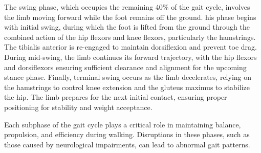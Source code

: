 The swing phase, which occupies the remaining 40\% of the gait cycle, involves the limb moving forward while the foot remains off the ground. his phase begins with initial swing, during which the foot is lifted from the ground through the combined action of the hip flexors and knee flexors, particularly the hamstrings. The tibialis anterior is re-engaged to maintain dorsiflexion and prevent toe drag. During mid-swing, the limb continues its forward trajectory, with the hip flexors and dorsiflexors ensuring sufficient clearance and alignment for the upcoming stance phase. Finally, terminal swing occurs as the limb decelerates, relying on the hamstrings to control knee extension and the gluteus maximus to stabilize the hip. The limb prepares for the next initial contact, ensuring proper positioning for stability and weight acceptance.

Each subphase of the gait cycle plays a critical role in maintaining balance, propulsion, and efficiency during walking. Disruptions in these phases, such as those caused by neurological impairments, can lead to abnormal gait patterns.






